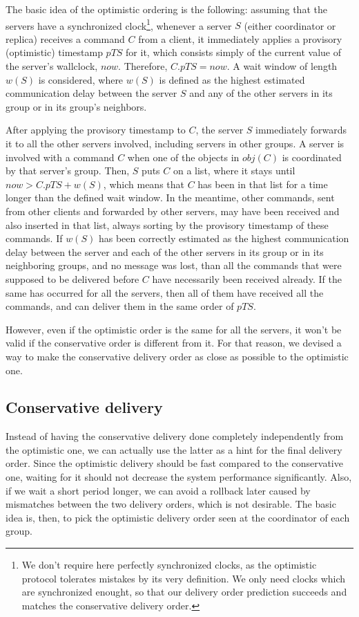 \documentclass[times, 10pt]{article}
\begin{document}
The basic idea of the optimistic ordering is the following: assuming that the servers have a synchronized clock\footnote{We don't require here perfectly synchronized clocks, as the optimistic protocol tolerates mistakes by its very definition. We only need clocks which are synchronized enought, so that our delivery order prediction succeeds and matches the conservative delivery order.}, whenever a server $S$ (either coordinator or replica) receives a command $C$ from a client, it immediately applies a provisory (optimistic) timestamp $pTS$ for it, which consists simply of the current value of the server's wallclock, $now$. Therefore, $C.pTS=now$. A wait window of length $w(S)$ is considered, where $w(S)$ is defined as the highest estimated communication delay between the server $S$ and any of the other servers in its group or in its group's neighbors.

After applying the provisory timestamp to $C$, the server $S$ immediately forwards it to all the other servers involved, including servers in other groups. A server is involved with a command $C$ when one of the objects in $obj(C)$ is coordinated by that server's group. Then, $S$ puts $C$ on a list, where it stays until $now>C.pTS+w(S)$, which means that $C$ has been in that list for a time longer than the defined wait window. In the meantime, other commands, sent from other clients and forwarded by other servers, may have been received and also inserted in that list, always sorting by the provisory timestamp of these commands. If $w(S)$ has been correctly estimated as the highest communication delay between the server and each of the other servers in its group or in its neighboring groups, and no message was lost, than all the commands that were supposed to be delivered before $C$ have necessarily been received already. If the same has occurred for all the servers, then all of them have received all the commands, and can deliver them in the same order of $pTS$.

However, even if the optimistic order is the same for all the servers, it won't be valid if the conservative order is different from it. For that reason, we devised a way to make the conservative delivery order as close as possible to the optimistic one.

\subsection{Conservative delivery}

Instead of having the conservative delivery done completely independently from the optimistic one, we can actually use the latter as a hint for the final delivery order. Since the optimistic delivery should be fast compared to the conservative one, waiting for it should not decrease the system performance significantly. Also, if we wait a short period longer, we can avoid a rollback later caused by mismatches between the two delivery orders, which is not desirable. The basic idea is, then, to pick the optimistic delivery order seen at the coordinator of each group.
\end{document}
